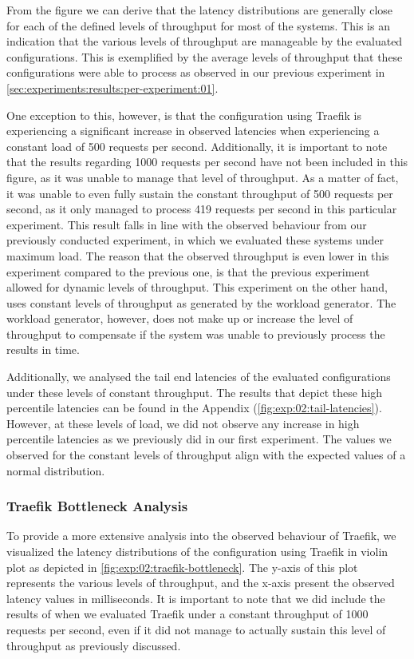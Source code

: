 From the figure we can derive that the latency distributions are generally close for each of the defined levels of throughput for most of the systems. This is an indication that the various levels of throughput are manageable by the evaluated configurations. This is exemplified by the average levels of throughput that these configurations were able to process as observed in our previous experiment in \cref{sec:experiments:results:per-experiment:01}. 

One exception to this, however, is that the configuration using Traefik is experiencing a significant increase in observed latencies when experiencing a constant load of 500 requests per second. Additionally, it is important to note that the results regarding 1000 requests per second have not been included in this figure, as it was unable to manage that level of throughput. As a matter of fact, it was unable to even fully sustain the constant throughput of 500 requests per second, as it only managed to process 419 requests per second in this particular experiment. This result falls in line with the observed behaviour from our previously conducted experiment, in which we evaluated these systems under maximum load. The reason that the observed throughput is even lower in this experiment compared to the previous one, is that the previous experiment allowed for dynamic levels of throughput. This experiment on the other hand, uses constant levels of throughput as generated by the workload generator. The workload generator, however, does not make up or increase the level of throughput to compensate if the system was unable to previously process the results in time. 

Additionally, we analysed the tail end latencies of the evaluated configurations under these levels of constant throughput. The results that depict these high percentile latencies can be found in the Appendix (\cref{fig:exp:02:tail-latencies}). However, at these levels of load, we did not observe any increase in high percentile latencies as we previously did in our first experiment. The values we observed for the constant levels of throughput align with the expected values of a normal distribution.

\subsubsection{Traefik Bottleneck Analysis}
\label{sec:experiments:results:per-experiment:02:traefik-bottleneck}

To provide a more extensive analysis into the observed behaviour of Traefik, we visualized the latency distributions of the configuration using Traefik in violin plot as depicted in \cref{fig:exp:02:traefik-bottleneck}. The y-axis of this plot represents the various levels of throughput, and the x-axis present the observed latency values in milliseconds. It is important to note that we did include the results of when we evaluated Traefik under a constant throughput of 1000 requests per second, even if it did not manage to actually sustain this level of throughput as previously discussed. 

